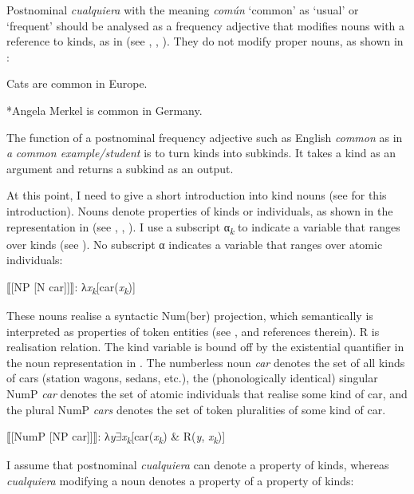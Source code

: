   Postnominal \textit{cualquiera} with the meaning \textit{común} ‘common’ as ‘usual’ or ‘frequent’ should be analysed as a frequency adjective that modifies nouns with a reference to kinds, as in  (see \citealt{Carlson1977}, \citealt{Chierchia1998}, \citealt{GehrkeMcNally2015}). They do not modify proper nouns, as shown in :

\label{bkm:Ref72354905}  Cats are common in Europe.

\label{bkm:Ref72354921}  *Angela Merkel is common in Germany.

The function of a postnominal frequency adjective such as English \textit{common} as in \textit{a} \textit{common example/student} is to turn kinds into subkinds. It takes a kind as an argument and returns a subkind as an output. 

  At this point, I need to give a short introduction into kind nouns (see \citealt{GehrkeMcNally2015} for this introduction). Nouns denote properties of kinds or individuals, as shown in the representation in  (see \citealt{Carlson1977}, \citealt{Chierchia1998}, \citealt{GehrkeMcNally2015}). I use a subscript α\textit{\textsubscript{k}} to indicate a variable that ranges over kinds (see \citealt{GehrkeMcNally2015}). No subscript α indicates a variable that ranges over atomic individuals:

\label{bkm:Ref42889594}  ⟦[NP [N car]]⟧: λ\textit{x\textsubscript{k}}[car(\textit{x\textsubscript{k}})] 

These nouns realise a syntactic Num(ber) projection, which semantically is interpreted as properties of token entities (see \citealt{GehrkeMcNally2015}, and references therein). R is  realisation relation. The kind variable is bound off by the existential quantifier in the noun representation in . The numberless noun \textit{car} denotes the set of all kinds of cars (station wagons, sedans, etc.), the (phonologically identical) singular NumP \textit{car} denotes the set of atomic individuals that realise some kind of car, and the plural NumP \textit{cars} denotes the set of token pluralities of some kind of car.

\label{bkm:Ref42889808}  ⟦[NumP [NP car]]⟧: λ\textit{y}${\exists}$\textit{x\textsubscript{k}}[car(\textit{x\textsubscript{k}}) \& R(\textit{y}, \textit{x\textsubscript{k}})]

I assume that postnominal \textit{cualquiera} can denote a property of kinds, whereas \textit{cualquiera} modifying a noun denotes a property of a property of kinds:

